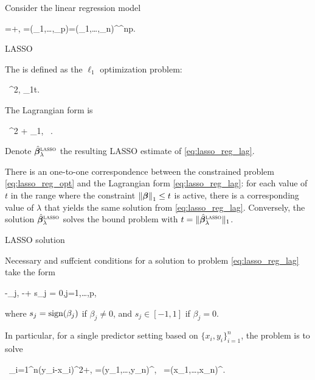 \documentclass[10pt,a4paper]{book}
\begin{document}
Consider the linear regression model 
\begin{sequation*}
	\Y=\X\bab+\bave, \qquad \X=(\X_1,\ldots,\X_p)=(\x_1,\ldots,\x_n)^\TT\in\bbR^{n\times p}.
\end{sequation*} 
\begin{defbox}{LASSO}
	\begin{definition}\label{def:lasso_reg}
		The  is defined as the $\ell_1$ optimization problem:
		\begin{sequation}\label{eq:lasso_reg_opt}
			 \ \norm{\Y-\X\bab}^2, \quad {} \quad \norm{\bab}_1\leq t.
		\end{sequation}
		The Lagrangian form is
		\begin{sequation}\label{eq:lasso_reg_lag}
			 \ \norm{\Y-\X\bab}^2 + \lambda\norm{\bab}_1, \ \lambda{}.
		\end{sequation}
		Denote $\hat{{\boldsymbol\beta}}_{\lambda}^{\textsc{lasso}}$ the resulting LASSO estimate of \eqref{eq:lasso_reg_lag}. 
	\end{definition}
\end{defbox}
There is an one-to-one correspondence between the constrained problem \eqref{eq:lasso_reg_opt} and the Lagrangian form \eqref{eq:lasso_reg_lag}: for each value of $t$ in the range where the constraint $\left\lVert{\boldsymbol\beta}\right\rVert_1\leq t$ is active, there is a corresponding value of $\lambda$ that yields the same solution from \eqref{eq:lasso_reg_lag}.
Conversely, the solution $\hat{{\boldsymbol\beta}}_{\lambda}^{\textsc{lasso}}$ solves the bound problem with $t=\lVert\hat{{\boldsymbol\beta}}_{\lambda}^{\textsc{lasso}}\rVert_1$. 
\begin{thmbox}{LASSO solution}
	\begin{proposition}\label{prop:lasso_sol}
		Necessary and suffcient conditions for a
		solution to problem \eqref{eq:lasso_reg_lag} take the form 
		\begin{sequation}\label{eq:lasso_sol_FONC}
		-\langle \X_j, \Y-\X\bab \rangle + \lambda s_j = 0,\quad j=1,\ldots,p, 
		\end{sequation}
		where $s_j=\mathrm{sign}(\beta_j)$ if $\beta_j\neq 0$, and $s_j\in[-1,1]$ if $\beta_j=0$.   
	\end{proposition}
\end{thmbox}
In particular, for a single predictor setting based on $\{x_i,y_i\}_{i=1}^n$, the problem is to solve
\begin{sequation*}
	\minimize{\beta\in\bbR}\ \sum_{i=1}^{n}(y_i-x_i\beta)^2+\lambda\abs{\beta}, \qquad \y=(y_1,\ldots,y_n)^\TT, \ \x=(x_1,\ldots,x_n)^\TT.
\end{sequation*}
\end{document}
